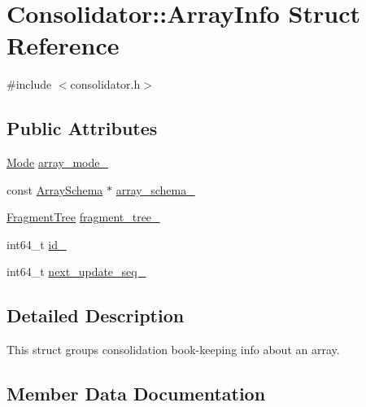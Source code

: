 \hypertarget{structConsolidator_1_1ArrayInfo}{}\section{Consolidator\+:\+:Array\+Info Struct Reference}
\label{structConsolidator_1_1ArrayInfo}


{\ttfamily \#include $<$consolidator.\+h$>$}

\subsection*{Public Attributes}
\begin{DoxyCompactItemize}
\item 
\hyperlink{classConsolidator_abb45365555fb0f3aeca0f933027ca54d}{Mode} \hyperlink{structConsolidator_1_1ArrayInfo_a49b9e65fbf3c2e26984a856e8f713ca0}{array\+\_\+mode\+\_\+}
\item 
const \hyperlink{classArraySchema}{Array\+Schema} $\ast$ \hyperlink{structConsolidator_1_1ArrayInfo_a86b809404e3d928ffbfd42758637ef33}{array\+\_\+schema\+\_\+}
\item 
\hyperlink{classConsolidator_a34bc002a0189718ae47bb2e934a8300f}{Fragment\+Tree} \hyperlink{structConsolidator_1_1ArrayInfo_addaf7f6cce37313263f383aaf3fef768}{fragment\+\_\+tree\+\_\+}
\item 
int64\+\_\+t \hyperlink{structConsolidator_1_1ArrayInfo_a26f7eef1996807751085758eb6251e2a}{id\+\_\+}
\item 
int64\+\_\+t \hyperlink{structConsolidator_1_1ArrayInfo_a3b947e8e8b2be5019cc6bf5bc60a1dfd}{next\+\_\+update\+\_\+seq\+\_\+}
\end{DoxyCompactItemize}


\subsection{Detailed Description}
This struct groups consolidation book-\/keeping info about an array. 

\subsection{Member Data Documentation}
\hypertarget{structConsolidator_1_1ArrayInfo_a49b9e65fbf3c2e26984a856e8f713ca0}{}
